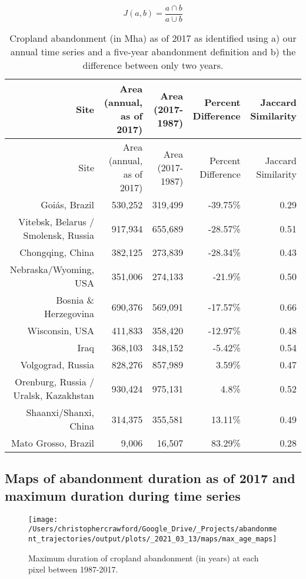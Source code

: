 \documentclass[9pt,twoside,lineno]{pnas-new}
\begin{document}
\begin{equation}
J(a,b) = \frac{a\cap b}{a\cup b} \label{eq:jaccard-equation}
\end{equation}

\begin{longtable}[]{@{}rrrrr@{}}
\caption{\label{tab:twoyr-diff-table}Cropland abandonment (in Mha) as of 2017 as identified using a) our annual time series and a five-year abandonment definition and b) the difference between only two years.}\tabularnewline
\toprule
Site & Area (annual, as of 2017) & Area (2017-1987) & Percent Difference & Jaccard Similarity \\
\midrule
\endfirsthead
\toprule
Site & Area (annual, as of 2017) & Area (2017-1987) & Percent Difference & Jaccard Similarity \\
\midrule
\endhead
Goiás, Brazil & 530,252 & 319,499 & -39.75\% & 0.29 \\
Vitebsk, Belarus / Smolensk, Russia & 917,934 & 655,689 & -28.57\% & 0.51 \\
Chongqing, China & 382,125 & 273,839 & -28.34\% & 0.43 \\
Nebraska/Wyoming, USA & 351,006 & 274,133 & -21.9\% & 0.50 \\
Bosnia \& Herzegovina & 690,376 & 569,091 & -17.57\% & 0.66 \\
Wisconsin, USA & 411,833 & 358,420 & -12.97\% & 0.48 \\
Iraq & 368,103 & 348,152 & -5.42\% & 0.54 \\
Volgograd, Russia & 828,276 & 857,989 & 3.59\% & 0.47 \\
Orenburg, Russia / Uralsk, Kazakhstan & 930,424 & 975,131 & 4.8\% & 0.52 \\
Shaanxi/Shanxi, China & 314,375 & 355,581 & 13.11\% & 0.49 \\
Mato Grosso, Brazil & 9,006 & 16,507 & 83.29\% & 0.28 \\
\bottomrule
\end{longtable}

\hypertarget{maps-of-abandonment-duration-as-of-2017-and-maximum-duration-during-time-series}{%
\subsection{Maps of abandonment duration as of 2017 and maximum duration during time series}\label{maps-of-abandonment-duration-as-of-2017-and-maximum-duration-during-time-series}}



\begin{figure}
\texttt{[image: /Users/christophercrawford/Google\_Drive/\_Projects/abandonment\_trajectories/output/plots/\_2021\_03\_13/maps/max\_age\_maps]} \caption{Maximum duration of cropland abandonment (in years) at each pixel between 1987-2017.}\label{fig:map-abn-age-max}
\end{figure}
\end{document}
